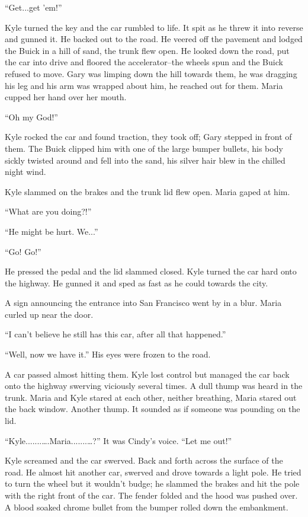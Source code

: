 \documentclass[
]{article}
\begin{document}
``Get...get 'em!''

Kyle turned the key and the car rumbled to life. It spit as he threw it
into reverse and gunned it. He backed out to the road. He veered off the
pavement and lodged the Buick in a hill of sand, the trunk flew open. He
looked down the road, put the car into drive and floored the
accelerator--the wheels spun and the Buick refused to move. Gary was
limping down the hill towards them, he was dragging his leg and his arm
was wrapped about him, he reached out for them. Maria cupped her hand
over her mouth.

``Oh my God!''

Kyle rocked the car and found traction, they took off; Gary stepped in
front of them. The Buick clipped him with one of the large bumper
bullets, his body sickly twisted around and fell into the sand, his
silver hair blew in the chilled night wind.

Kyle slammed on the brakes and the trunk lid flew open. Maria gaped at
him.

``What are you doing?!''

``He might be hurt. We...''

``Go! Go!''

He pressed the pedal and the lid slammed closed. Kyle turned the car
hard onto the highway. He gunned it and sped as fast as he could towards
the city.

A sign announcing the entrance into San Francisco went by in a blur.
Maria curled up near the door.

``I can't believe he still has this car, after all that happened.''

``Well, now we have it.'' His eyes were frozen to the road.

A car passed almost hitting them. Kyle lost control but managed the car
back onto the highway swerving viciously several times. A dull thump was
heard in the trunk. Maria and Kyle stared at each other, neither
breathing, Maria stared out the back window. Another thump. It sounded
as if someone was pounding on the lid.

``Kyle.......\ldots.Maria.......\ldots?'' It was Cindy's voice. ``Let me
out!''

Kyle screamed and the car swerved. Back and forth across the surface of
the road. He almost hit another car, swerved and drove towards a light
pole. He tried to turn the wheel but it wouldn't budge; he slammed the
brakes and hit the pole with the right front of the car. The fender
folded and the hood was pushed over. A blood soaked chrome bullet from
the bumper rolled down the embankment.
\end{document}
